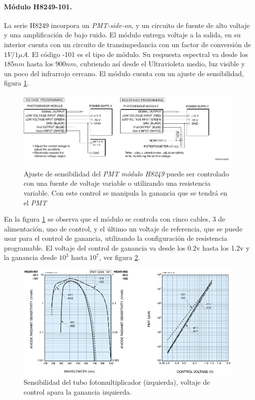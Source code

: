 \paragraph{Módulo H8249-101.}
La serie H8249 incorpora un \textit{PMT-side-on}, y un circuito de fuente de alto voltaje y una amplificación de bajo ruido. El módulo entrega voltaje a la salida, en su interior cuenta con un circuito de transimpedancia con un factor de conversión de $1V/1\mu A$. El código -101 es el tipo de módulo. Su respuesta espectral va desde los $185nm$ hasta los $900nm$, cubriendo así desde el Ultravioleta medio, luz visible y un poco del infrarrojo cercano.
El módulo cuenta con un ajuste de sensibilidad, figura \ref{fig:sensibilidadajuste}.

\begin{figure}[h]
	\centering
	\includegraphics[width=0.8\linewidth]{Imagenes/2/SensibilidadAjuste}
	\caption[Ajuste de sensibilidad del \textit{PMT módulo H8249}]{Ajuste de sensibilidad del \textit{PMT módulo H8249} puede ser controlado con una fuente de voltaje variable o utilizando una resistencia variable. Con este control se manipula la ganancia que se tendrá en el \textit{PMT}\cite{Hamamatsu2008}}
	\label{fig:sensibilidadajuste}
\end{figure}

 En la figura \ref{fig:sensibilidadajuste} se observa que el módulo se controla con cinco cables, 3 de alimentación, uno de control, y el último un voltaje de referencia, que se puede usar para el control de ganancia, utilizando la configuración de resistencia programable. El voltaje del control de ganancia va desde los 0.2v hasta los 1.2v y la ganancia desde $10^{3}$ hasta $10^{7}$, ver figura \ref{fig:pmtgain}.
 \begin{figure}
 	\centering
 	\includegraphics[width=0.7\linewidth]{Imagenes/2/PMT_GAIN}
 	\caption[Sensibilidad y ganancia H8249]{Sensibilidad del tubo fotomultiplicador (izquierda), voltaje de control apara la ganancia izquierda. \cite{Hamamatsu2008}}
 	\label{fig:pmtgain}
 \end{figure}

